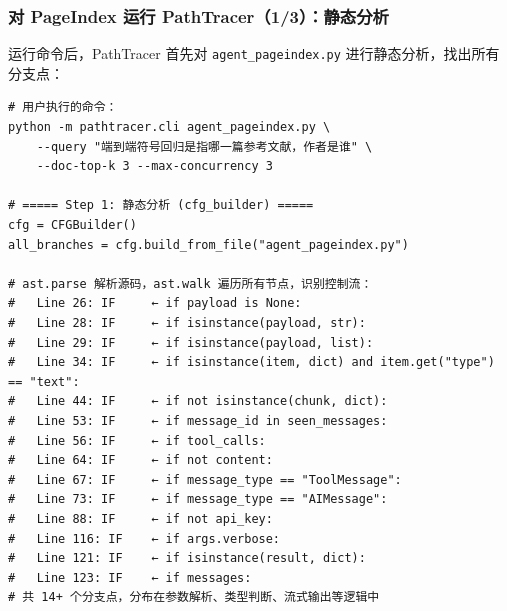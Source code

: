 \documentclass[presentation,aspectratio=169,fontset=none]{ctexbeamer}
\begin{document}
\begin{frame}[fragile]
\frametitle{对 PageIndex 运行 PathTracer（1/3）：静态分析}
{\scriptsize 运行命令后，PathTracer 首先对 \texttt{agent\_pageindex.py} 进行静态分析，找出所有分支点：}

\vspace{0.05cm}
{\tiny
\begin{verbatim}
# 用户执行的命令：
python -m pathtracer.cli agent_pageindex.py \
    --query "端到端符号回归是指哪一篇参考文献，作者是谁" \
    --doc-top-k 3 --max-concurrency 3

# ===== Step 1: 静态分析 (cfg_builder) =====
cfg = CFGBuilder()
all_branches = cfg.build_from_file("agent_pageindex.py")

# ast.parse 解析源码，ast.walk 遍历所有节点，识别控制流：
#   Line 26: IF     ← if payload is None:
#   Line 28: IF     ← if isinstance(payload, str):
#   Line 29: IF     ← if isinstance(payload, list):
#   Line 34: IF     ← if isinstance(item, dict) and item.get("type") == "text":
#   Line 44: IF     ← if not isinstance(chunk, dict):
#   Line 53: IF     ← if message_id in seen_messages:
#   Line 56: IF     ← if tool_calls:
#   Line 64: IF     ← if not content:
#   Line 67: IF     ← if message_type == "ToolMessage":
#   Line 73: IF     ← if message_type == "AIMessage":
#   Line 88: IF     ← if not api_key:
#   Line 116: IF    ← if args.verbose:
#   Line 121: IF    ← if isinstance(result, dict):
#   Line 123: IF    ← if messages:
# 共 14+ 个分支点，分布在参数解析、类型判断、流式输出等逻辑中
\end{verbatim}}
\end{frame}

\end{document}
